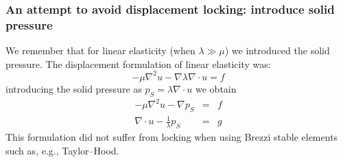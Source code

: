 \begin{frame}
\frametitle{An attempt to avoid displacement locking: introduce solid pressure}
We remember that for linear elasticity (when $\lambda \gg \mu$) we 
introduced the solid pressure. The displacement formulation
of linear elasticity was:  
\[
-\mu \nabla^2 u  - \nabla \lambda \nabla \cdot u = f  
\]
introducing the solid pressure as $p_S = \lambda \nabla \cdot u$ we obtain 
\begin{eqnarray*}
-\mu \nabla^2 u  - \nabla p_S &=& f \\  
\nabla\cdot u - \frac{1}{\lambda} p_S &=& g 
\end{eqnarray*}
This formulation did not suffer from locking when using Brezzi stable elements such as, e.g.,
Taylor--Hood. 
\end{frame}

